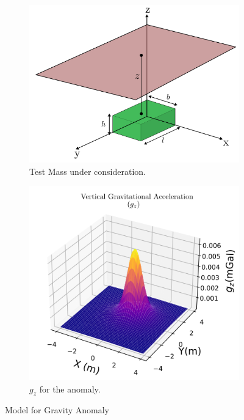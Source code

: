 \documentclass[a4paper,11pt]{article}
\begin{document}
\begin{figure}[ht]
     \centering
     \begin{subfigure}[b]{0.4\textwidth}
         \centering
         \includegraphics[scale = 0.4]{images/anomaly_illustraion.png}
         \caption{Test Mass under consideration.}
         \label{fig:gz1}
     \end{subfigure}
     \hfill
     \begin{subfigure}[b]{0.4\textwidth}
         \centering
          \includegraphics[scale = 3.6]{plots/gravity_ana.png}
         \caption{$g_{z}$ for the anomaly.}
         \label{fig:gz2}
     \end{subfigure}
        \caption{Model for Gravity Anomaly }
        \label{fig:gz}
\end{figure}
\end{document}

